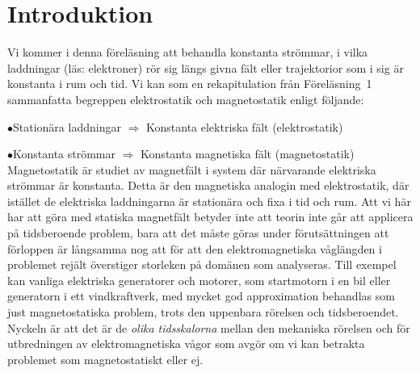 
\section{Introduktion}
Vi kommer i denna f{\"o}rel{\"a}sning att behandla konstanta str{\"o}mmar, i
vilka laddningar (l{\"a}s: elektroner) r{\"o}r sig l{\"a}ngs givna f{\"a}lt
eller trajektorior som i sig {\"a}r konstanta i rum och tid.
Vi kan som en rekapitulation fr{\aa}n F{\"o}rel{\"a}sning~1 sammanfatta
begreppen elektrostatik och magnetostatik enligt f{\"o}ljande:
\medskip
\item{$\bullet$}{Station{\"a}ra laddningar $\Rightarrow$
  Konstanta elektriska f{\"a}lt (elektrostatik)}
\item{$\bullet$}{Konstanta str{\"o}mmar $\Rightarrow$
  Konstanta magnetiska f{\"a}lt (magnetostatik)}
\medskip
\noindent
Magnetostatik {\"a}r studiet av magnetf{\"a}lt i system d{\"a}r n{\"a}rvarande
elektriska str{\"o}mmar {\"a}r konstanta. Detta {\"a}r den magnetiska analogin
med elektrostatik, d{\"a}r ist{\"a}llet de elektriska laddningarna {\"a}r
station{\"a}ra och fixa i tid och rum.
Att vi h{\"a}r har att g{\"o}ra med statiska magnetf{\"a}lt betyder inte att
teorin inte g{\aa}r att applicera p{\aa} tidsberoende problem, bara att det
m{\aa}ste g{\"o}ras under f{\"o}ruts{\"a}ttningen att f{\"o}rloppen {\"a}r
l{\aa}ngsamma nog att f{\"o}r att den elektromagnetiska v{\aa}gl{\"a}ngden
 i problemet rej{\"a}lt {\"o}verstiger
storleken p{\aa} dom{\"a}nen som analyseras.
Till exempel kan vanliga elektriska generatorer och motorer, som startmotorn
i en bil eller generatorn i ett vindkraftverk, med mycket god approximation
behandlas som just magnetostatiska problem, trots den uppenbara r{\"o}relsen
och tidsberoendet. Nyckeln {\"a}r att det {\"a}r de {\it olika tidsskalorna}
mellan den mekaniska r{\"o}relsen och f{\"o}r utbredningen av elektromagnetiska
v{\aa}gor som avg{\"o}r om vi kan betrakta problemet som magnetostatiskt eller
ej.

